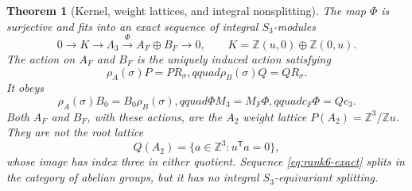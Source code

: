 \documentclass[11pt]{article}
\newtheorem{theorem}{Theorem}[section]
\theoremstyle{definition}
\theoremstyle{remark}
\numberwithin{equation}{section}
\begin{document}
\begin{theorem}[Kernel, weight lattices, and integral nonsplitting]
\label{thm:rank6-exact-sequence}
The map \(\Phi\) is surjective and fits into an exact sequence of integral
\(S_3\)-modules
\begin{equation}
 0\longrightarrow K\longrightarrow\Lambda_3
 \xrightarrow{\ \Phi\ }A_F\oplus B_F\longrightarrow0,
 \qquad
 K=\mathbb Z(u,0)\oplus\mathbb Z(0,u).                 \label{eq:rank6-exact}
\end{equation}
The action on \(A_F\) and \(B_F\) is the uniquely induced action satisfying
\begin{equation}
 \rho_A(\sigma)P=PR_\sigma,qquad
 \rho_B(\sigma)Q=QR_\sigma.                            \label{eq:rank6-target-action}
\end{equation}
It obeys
\[
 \rho_A(\sigma)B_0=B_0\rho_B(\sigma),qquad
 \Phi M_3=M_F\Phi,qquad c_F\Phi=Qc_3.
\]
Both \(A_F\) and \(B_F\), with these actions, are the \(A_2\) weight
lattice \(P(A_2)=\mathbb Z^3/\mathbb Zu\).  They are not the root lattice
\[
 Q(A_2)=\{a\in\mathbb Z^3:u^{\mathsf T}a=0\},
\]
whose image has index three in either quotient.  Sequence
\eqref{eq:rank6-exact} splits in the category of abelian groups, but it has
no integral \(S_3\)-equivariant splitting.
\end{theorem}
\end{document}
